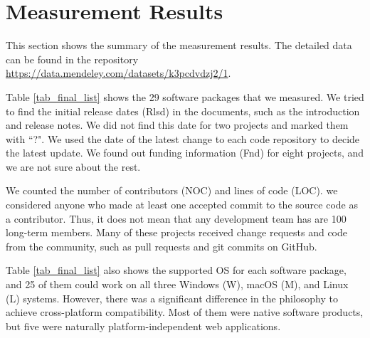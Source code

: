 \chapter{Measurement Results}
\label{ch_results}

This section shows the summary of the measurement results. The detailed data can be found in the repository \hyperlink{https://data.mendeley.com/datasets/k3pcdvdzj2/1}{https://data.mendeley.com/datasets/k3pcdvdzj2/1}.

Table \ref{tab_final_list} shows the 29 software packages that we measured. We tried to find the initial release dates (Rlsd) in the documents, such as the introduction and release notes. We did not find this date for two projects and marked them with ``?". We used the date of the latest change to each code repository to decide the latest update. We found out funding information (Fnd) for eight projects, and we are not sure about the rest.

We counted the number of contributors (NOC) and lines of code (LOC). we considered anyone who made at least one accepted commit to the source code as a contributor. Thus, it does not mean that any development team has are 100 long-term members. Many of these projects received change requests and code from the community, such as pull requests and git commits on GitHub.

Table \ref{tab_final_list} also shows the supported OS for each software package, and 25 of them could work on all three Windows (W), macOS (M), and Linux (L) systems. However, there was a significant difference in the philosophy to achieve cross-platform compatibility. Most of them were native software products, but five were naturally platform-independent web applications.

